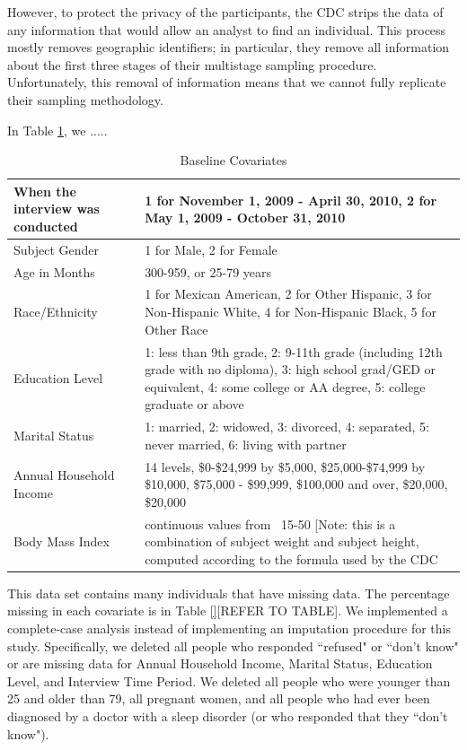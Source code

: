 \documentclass{article}
\begin{document}
However, to protect the privacy of the participants, the CDC strips the data of any information that would allow an analyst to find an individual.  This process mostly removes geographic identifiers; in particular, they remove all information about the first three stages of their multistage sampling procedure.  Unfortunately, this removal of information means that we cannot fully replicate their sampling methodology.

In Table \ref{tab:Covariates}, we .....

\begin{table}
\begin{tabular}{| p{3cm} | p{7cm} |}
\hline
When the interview was conducted & 1 for November 1, 2009 - April 30, 2010, 2 for May 1, 2009 - October 31, 2010\\
\hline
Subject Gender & 1 for Male, 2 for Female\\
\hline
Age in Months & 300-959, or 25-79 years\\
\hline
Race/Ethnicity & 1 for Mexican American, 2 for Other Hispanic, 3 for Non-Hispanic White, 4 for Non-Hispanic Black, 5 for Other Race\\
\hline
Education Level & 1: less than 9th grade, 2: 9-11th grade (including 12th grade with no diploma), 3: high school grad/GED or equivalent, 4: some college or AA degree, 5: college graduate or above\\
\hline
Marital Status & 1: married, 2: widowed, 3: divorced, 4: separated, 5: never married, 6: living with partner\\
\hline
Annual Household Income & 14 levels, \$0-\$24,999 by \$5,000, \$25,000-\$74,999 by \$10,000,  \$75,000 - \$99,999, \$100,000 and over, \$20,000, \$20,000\\
\hline
Body Mass Index & continuous values from ~15-50 [Note: this is a combination of subject weight and subject height, computed according to the formula used by the CDC \cite{bmi}\\
\hline
\end{tabular}
\caption{Baseline Covariates}
\label{tab:Covariates}
\end{table}

This data set contains many individuals that have missing data.  The percentage missing in each covariate is in Table \ref{}[REFER TO TABLE].  We implemented a complete-case analysis instead of implementing an imputation procedure for this study. Specifically, we deleted all people who responded ``refused" or ``don't know" or are missing data for Annual Household Income, Marital Status, Education Level, and Interview Time Period.  We deleted all people who were younger than 25 and older than 79, all pregnant women, and all people who had ever been diagnosed by a doctor with a sleep disorder (or who responded that they ``don't know").  
\end{document}
